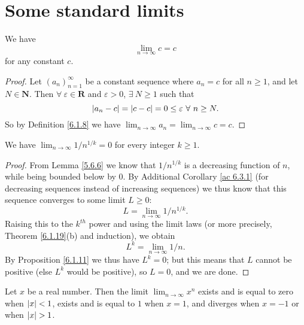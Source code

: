 \section{Some standard limits}\label{sec 6.5}

\begin{additional corollary}\label{ac 6.5.1}
We have
\[
    \lim_{n \to \infty} c = c
\]
for any constant \(c\).
\end{additional corollary}

\begin{proof}
Let \((a_n)_{n = 1}^\infty\) be a constant sequence where \(a_n = c\) for all \(n \geq 1\), and let \(N \in \mathbf{N}\).
Then \(\forall\ \varepsilon \in \mathbf{R}\) and \(\varepsilon > 0\), \(\exists\ N \geq 1\) such that
\[
    \abs*{a_n - c} = \abs*{c - c} = 0 \leq \varepsilon \ \forall \ n \geq N.
\]
So by Definition \ref{6.1.8} we have \(\lim_{n \to \infty} a_n = \lim_{n \to \infty} c = c\).
\end{proof}

\begin{corollary}\label{6.5.1}
We have \(\lim_{n \to \infty} 1 / n^{1 / k} = 0\) for every integer \(k \geq 1\).
\end{corollary}

\begin{proof}
From Lemma \ref{5.6.6} we know that \(1 / n^{1 / k}\) is a decreasing function of \(n\), while being bounded below by \(0\).
By Additional Corollary \ref{ac 6.3.1} (for decreasing sequences instead of increasing sequences) we thus know that this sequence converges to some limit \(L \geq 0\):
\[
    L = \lim_{n \to \infty} 1 / n^{1 / k}.
\]
Raising this to the \(k^{th}\) power and using the limit laws (or more precisely, Theorem \ref{6.1.19}(b) and induction), we obtain
\[
    L^k = \lim_{n \to \infty} 1 / n.
\]
By Proposition \ref{6.1.11} we thus have \(L^k = 0\);
but this means that \(L\) cannot be positive (else \(L^k\) would be positive), so \(L = 0\), and we are done.
\end{proof}

\begin{lemma}\label{6.5.2}
Let \(x\) be a real number.
Then the limit \(\lim_{n \to \infty} x^n\) exists and is equal to zero when \(\abs*{x} < 1\), exists and is equal to \(1\) when \(x = 1\), and diverges when \(x = -1\) or when \(\abs*{x} > 1\).
\end{lemma}

